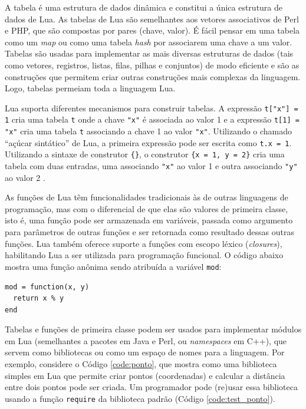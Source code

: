 A tabela é uma estrutura de dados dinâmica e constitui a única estrutura de dados de Lua. As tabelas de Lua são semelhantes aos vetores associativos de Perl e PHP, que são compostas por pares (chave, valor). É fácil pensar em uma tabela como um {\em map} ou como uma tabela {\em hash} por associarem uma chave a um valor. Tabelas são usadas para implementar as mais diversas estruturas de dados (tais como vetores, registros, listas, filas, pilhas e conjuntos) de modo eficiente e são as construções que permitem criar outras construções mais complexas da linguagem. Logo, tabelas permeiam toda a linguagem Lua.

Lua suporta diferentes mecanismos para construir tabelas. A expressão \verb|t["x"] = 1| cria uma tabela \verb|t| onde a chave \verb|"x"| é associada ao valor 1 e a expressão \verb|t[1] = "x"| cria uma tabela \verb|t| associando a chave 1 ao valor \verb|"x"|. Utilizando o chamado ``açúcar sintático'' de Lua, a primeira expressão pode ser escrita como \verb|t.x = 1|. Utilizando a sintaxe de construtor \verb|{}|, o construtor \verb|{x = 1, y = 2}| cria uma tabela com duas entradas, uma associando \verb|"x"| ao valor 1 e outra associando \verb|"y"| ao valor 2 \cite{Ierusalimschy2018:LDL:3289258.3186277}.

As funções de Lua têm funcionalidades tradicionais às de outras linguagens de programação, mas com o diferencial de que elas são valores de primeira classe, isto é, uma função pode ser armazenada em variáveis, passada como argumento para parâmetros de outras funções e ser retornada como resultado dessas outras funções. Lua também oferece suporte a funções com escopo léxico ({\em closures}), habilitando Lua a ser utilizada para programação funcional. O código abaixo mostra uma função anônima sendo atribuída a variável \verb|mod|:

\begin{Verbatim}
mod = function(x, y)
  return x % y
end
\end{Verbatim}

Tabelas e funções de primeira classe podem ser usados para implementar módulos em Lua (semelhantes a pacotes em Java e Perl, ou {\em namespaces} em C++), que servem como bibliotecas ou como um espaço de nomes para a linguagem. Por exemplo, considere o Código \ref{code:ponto}, que mostra como uma biblioteca simples em Lua que permite criar pontos (coordenadas) e calcular a distância entre dois pontos pode ser criada. Um programador pode (re)usar essa biblioteca usando a função \verb|require| da biblioteca padrão (Código \ref{code:test_ponto}).

